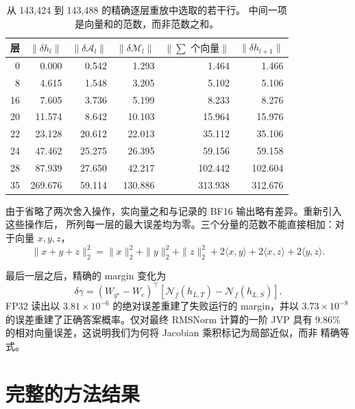\begin{table}[h]
  \caption{从 143,424 到 143,488 的精确逐层重放中选取的若干行。
  中间一项是向量和的范数，而非范数之和。}
  \label{tab:layer-replay}
  \centering
  \small
  \begin{tabular}{r rrr rr}
    \toprule
    层 & $\|\delta h_l\|$ & $\|\delta\mathcal A_l\|$ &
    $\|\delta\mathcal M_l\|$ & $\|\sum\text{ 个向量}\|$ &
    $\|\delta h_{l+1}\|$\\
    \midrule
    0  & 0.000   & 0.542  & 1.293   & 1.464   & 1.466\\
    8  & 4.615   & 1.548  & 3.205   & 5.102   & 5.106\\
    16 & 7.605   & 3.736  & 5.199   & 8.233   & 8.276\\
    20 & 11.574  & 8.642  & 10.103  & 15.964  & 15.976\\
    22 & 23.128  & 20.612 & 22.013  & 35.112  & 35.106\\
    24 & 47.462  & 25.275 & 26.395  & 59.156  & 59.158\\
    28 & 87.939  & 27.650 & 42.217  & 102.442 & 102.604\\
    35 & 269.676 & 59.114 & 130.886 & 313.938 & 312.676\\
    \bottomrule
  \end{tabular}
\end{table}

由于省略了两次舍入操作，实向量之和与记录的 BF16 输出略有差异。重新引入这些操作后，
所列每一层的最大误差均为零。三个分量的范数不能直接相加：对于向量 $x,y,z$，
\begin{equation}
  \|x+y+z\|_2^2=\|x\|_2^2+\|y\|_2^2+\|z\|_2^2
  +2\langle x,y\rangle+2\langle x,z\rangle+2\langle y,z\rangle.
\end{equation}

最后一层之后，精确的 margin 变化为
\begin{equation}
  \delta\gamma=
  (W_{y^\star}-W_c)^\top
  [\mathcal N_f(h_{L,T})-\mathcal N_f(h_{L,S})].
\end{equation}
FP32 读出以 $3.81\times10^{-6}$ 的绝对误差重建了失败运行的 margin，并以
$3.73\times10^{-8}$ 的误差重建了正确答案概率。仅对最终 RMSNorm 计算的一阶 JVP
具有 9.86\% 的相对向量误差，这说明我们为何将 Jacobian 乘积标记为局部近似，而非
精确等式。

\section{完整的方法结果}
\label{app:full-results}

